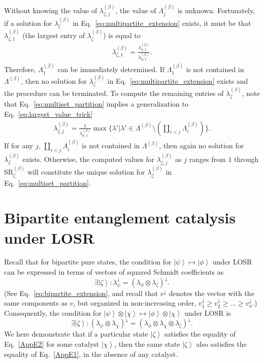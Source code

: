 \documentclass[prx,11pt,letterpaper,twocolumn,accepted=2023-11-27]{quantumarticle}
\newcommand{\rob}{\color{black}}
\newcommand{\blk}{\color{black}}
\newcommand{\ket}[1]{\left| #1 \right>}
\theoremstyle{plain}
\theoremstyle{definition}
\begin{document}
\begin{appendices}
Without knowing the value of $\lambda_{\zeta,j}^{(\beta)}$, the value of $\Lambda_{j}^{(\beta)}$ is unknown. Fortunately, if a solution for $\lambda_{\zeta}^{(\beta)}$ in Eq.~\eqref{eq:multipartite_extension} exists, it must be that $\lambda_{\zeta,1}^{(\beta)}$ (the largest entry of $\lambda_{\zeta}^{(\beta)}$) is equal to
\begin{align}
    \label{eq:largest_value_trick}
    \lambda_{\zeta,1}^{(\beta)} = \frac{\lambda_{\psi,1}^{(\beta)}}{\lambda_{\phi,1}^{(\beta)}}.
\end{align}
Therefore, $\Lambda_{1}^{(\beta)}$ can be immediately determined. If $\Lambda_{1}^{(\beta)}$ is not contained in $\Lambda^{(\beta)}$, then no solution for $\lambda_{\zeta}^{(\beta)}$ in Eq.~\eqref{eq:multipartite_extension} exists and the procedure can be terminated. To compute the remaining entries of $\lambda_{\zeta}^{(\beta)}$, note that Eq.~\eqref{eq:multiset_partition} implies a generalization to Eq.~\eqref{eq:largest_value_trick}
\begin{align}
    \lambda_{\zeta,j}^{(\beta)} = \frac{1}{\lambda_{\phi,1}^{(\beta)}}\max\{ \lambda' | \lambda' \in \Lambda^{(\beta)} \setminus (\coprod_{i<j}\Lambda_{i}^{(\beta)}) \}.
\end{align}
If for any $j$, $\coprod_{i<j}\Lambda_{i}^{(\beta)}$ is not contained in $\Lambda^{(\beta)}$, then again no solution for $\lambda_{\zeta}^{(\beta)}$ exists. Otherwise, the computed values for $\lambda_{\zeta,j}^{(\beta)}$ as $j$ ranges from $1$ through $\mathrm{SR}_{\zeta}^{(\beta)}$ will constitute the unique solution for $\lambda_{\zeta}^{(\beta)}$ in Eq.~\eqref{eq:multiset_partition}.
\blk

\section{Bipartite entanglement catalysis under LOSR}\label{catalysis}


Recall that for bipartite pure states, the condition for $\ket \psi \mapsto \ket \phi$ under LOSR can be expressed in terms of vectors of squared Schmidt coefficients as
\begin{equation}\label{AppE1}
\exists \ket \zeta: \lambda_{\psi}^{\downarrow} = (\lambda_{\phi} \otimes \lambda_{\zeta})^{\downarrow}.
\end{equation}
(See Eq.~\eqref{eq:bipartite_extension},  and recall that  $v^{\downarrow}$ denotes the vector with the same components as $v$, but organized in non-increasing order, $v^{\downarrow}_1 \ge v^{\downarrow}_2  \ge \dots \ge v^{\downarrow}_n $.\blk )
Consequently, the condition for $\ket \psi \otimes \ket \chi \mapsto \ket \phi \otimes \ket \chi$ under LOSR is 
\begin{equation}\label{AppE2}
\exists \ket \zeta: (\lambda_{\psi}\otimes \lambda_{\chi})^{\downarrow} = (\lambda_{\phi} \otimes \lambda_{\chi} \otimes \lambda_{\zeta})^{\downarrow}.
\end{equation}  
\rob We here demonstrate that if a particular state $\ket \zeta$ satisfies the equality of Eq.~\eqref{AppE2} for some catalyst $\ket \chi$, then the same state $\ket \zeta$ also satisfies the equality of Eq.~\eqref{AppE1}, in the absence of any catalyst.


\end{appendices}
\end{document}
